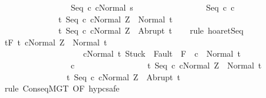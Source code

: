 \begin{isabellebody}
\ \ \ \ \ \ \ \ \ \ \ \ \ \ \ \ \ {\isasymGamma}{\isasymturnstile}Seq\ c{}\ c{}{\isasymdown}Normal\ s{\isacharbraceright}\ \isanewline
\ \ \ \ \ \ \ \ \ \ \ \ \ \ \ \ Seq\ c{}\ c{}\isanewline
\ \ \ \ \ \ \ \ \ \ \ \ \ \ {\isacharbraceleft}t{\isachardot}\ {\isasymGamma}{\isasymturnstile}{\isasymlangle}Seq\ c{}\ c{}{\isacharcomma}Normal\ Z{\isasymrangle}\ {\isasymRightarrow}\ Normal\ t{\isacharbraceright}{\isacharcomma}\isanewline
\ \ \ \ \ \ \ \ \ \ \ \ \ \ {\isacharbraceleft}t{\isachardot}\ {\isasymGamma}{\isasymturnstile}{\isasymlangle}Seq\ c{}\ c{}{\isacharcomma}Normal\ Z{\isasymrangle}\ {\isasymRightarrow}\ Abrupt\ t{\isacharbraceright}{\isachardoublequoteclose}\isanewline
\ \ \isamarkupfalse%
\ {\isacharparenleft}rule\ hoaret{\isachardot}Seq\ {\isacharparenright}\isanewline
\ \ \ \ \isamarkupfalse%
\ {\isachardoublequoteopen}{\isasymGamma}{\isacharcomma}{\isasymTheta}{\isasymturnstile}\isactrlsub t\isactrlbsub {\isacharslash}F\isactrlesub \ {\isacharbraceleft}t{\isachardot}\ {\isasymGamma}{\isasymturnstile}{\isasymlangle}c{}{\isacharcomma}Normal\ Z{\isasymrangle}\ {\isasymRightarrow}\ Normal\ t\ {\isasymand}\isanewline
\ \ \ \ \ \ \ \ \ \ \ \ \ \ \ \ \ \ \ \ {\isasymGamma}{\isasymturnstile}{\isasymlangle}c{}{\isacharcomma}Normal\ t{\isasymrangle}\ {\isasymRightarrow}{\isasymnotin}{\isacharparenleft}{\isacharbraceleft}Stuck{\isacharbraceright}\ {\isasymunion}\ Fault\ {\isacharbackquote}\ {\isacharparenleft}{\isacharminus}F{\isacharparenright}{\isacharparenright}\ {\isasymand}\ {\isasymGamma}{\isasymturnstile}c{}\ {\isasymdown}\ Normal\ t{\isacharbraceright}\isanewline
\ \ \ \ \ \ \ \ \ \ \ \ \ \ \ \ \ c{}\ \isanewline
\ \ \ \ \ \ \ \ \ \ \ \ \ \ \ \ {\isacharbraceleft}t{\isachardot}\ {\isasymGamma}{\isasymturnstile}{\isasymlangle}Seq\ c{}\ c{}{\isacharcomma}Normal\ Z{\isasymrangle}\ {\isasymRightarrow}\ Normal\ t{\isacharbraceright}{\isacharcomma}\isanewline
\ \ \ \ \ \ \ \ \ \ \ \ \ \ \ \ {\isacharbraceleft}t{\isachardot}\ {\isasymGamma}{\isasymturnstile}{\isasymlangle}Seq\ c{}\ c{}{\isacharcomma}Normal\ Z{\isasymrangle}\ {\isasymRightarrow}\ Abrupt\ t{\isacharbraceright}{\isachardoublequoteclose}\isanewline
\ \ \ \ \isamarkupfalse%
\ {\isacharparenleft}rule\ ConseqMGT\ {\isacharbrackleft}OF\ hyp{\isacharunderscore}c{}{\isacharbrackright}{\isacharcomma}safe{\isacharparenright}\isanewline
\ \ \ \ \ \ \isamarkupfalse%

\end{isabellebody}
